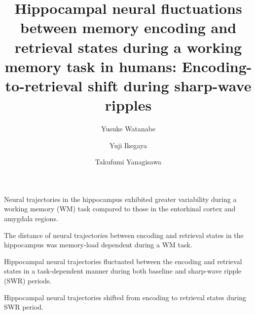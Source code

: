 \documentclass[final,3p,times,twocolumn]{elsarticle}
\begin{document}
\begin{frontmatter}
\begin{highlights}

\item Neural trajectories in the hippocampus exhibited greater variability during a working memory (WM) task compared to those in the entorhinal cortex and amygdala regions.

\item The distance of neural trajectories between encoding and retrieval states in the hippocampus was memory-load dependent during a WM task.


\item Hippocampal neural trajectories fluctuated between the encoding and retrieval states in a task-dependent manner during both baseline and sharp-wave ripple (SWR) periods.

\item Hippocampal neural trajectories shifted from encoding to retrieval states during SWR period.

\end{highlights}\title{
Hippocampal neural fluctuations between memory encoding and retrieval states during a working memory task in humans: Encoding-to-retrieval shift during sharp-wave ripples
}\author[1]{Yusuke Watanabe}
\author[2,3,4]{Yuji Ikegaya}
\author[1,5]{Takufumi Yanagisawa}

\address[1]{Institute for Advanced Cocreation studies, Osaka University, 2-2 Yamadaoka, Suita, 565-0871, Osaka, Japan}
\address[2]{Graduate School of Pharmaceutical Sciences, The University of Tokyo, 7-3-1 Hongo, Tokyo, 113-0033, Japan}
\address[3]{Institute for AI and Beyond, The University of Tokyo, 7-3-1 Hongo, Tokyo, 113-0033, Japan}
\address[4]{Center for Information and Neural Networks, National Institute of Information and Communications Technology, 1-4 Yamadaoka, Suita City, 565-0871, Osaka, Japan}
\address[5]{Department of Neurosurgery, Osaka University Graduate School of Medicine, 2-2 Yamadaoka, Osaka, 565-0871, Japan}


\end{frontmatter}
\end{document}
